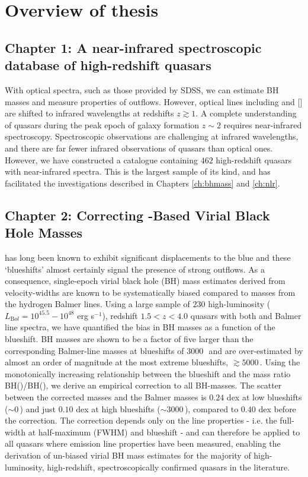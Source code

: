 \section{Overview of thesis}

\subsection{Chapter 1: A near-infrared spectroscopic database of high-redshift quasars}

With optical spectra, such as those provided by SDSS, we can estimate BH masses and measure properties of outflows. 
However, optical lines including \hb and [] are shifted to infrared wavelengths at redshifts $z\gtrsim1$. 
A complete understanding of quasars during the peak epoch of galaxy formation $z\sim2$ requires near-infrared spectroscopy. 
Spectroscopic observations are challenging at infrared wavelengths, and there are far fewer infrared observations of quasars than optical ones. 
However, we have constructed a catalogue containing $462$ high-redshift quasars with near-infrared spectra. 
This is the largest sample of its kind, and has facilitated the investigations described in Chapters \ref{ch:bhmass} and \ref{ch:nlr}.   

\subsection{Chapter 2: Correcting -Based Virial Black Hole Masses}

 has long been known to exhibit significant displacements to the blue and these `blueshifts' almost certainly signal the presence of strong outflows.
As a consequence, single-epoch virial black hole (BH) mass estimates derived from  velocity-widths are known to be systematically biased compared to masses from the hydrogen Balmer lines. 
Using a large sample of $230$ high-luminosity ($L_{\mathrm Bol} = 10^{45.5}-10^{48}$ erg s$^{-1}$), redshift $1.5 < z < 4.0$ quasars with both  and Balmer line spectra, we have quantified the bias in  BH masses as a function of the  blueshift. 
 BH masses are shown to be a factor of five larger than the corresponding Balmer-line masses at  blueshifts of $3000$\,\kms\, and are over-estimated by almost an order of magnitude at the most extreme blueshifts, $\gtrsim 5000$\,\kms.
Using the monotonically increasing relationship between the  blueshift and the mass ratio BH()/BH(\hans), we derive an empirical correction to all  BH-masses.
The scatter between the corrected  masses and the Balmer masses is $0.24$ dex at low  blueshifts ($\sim0$\,\kms) and just $0.10$ dex at high blueshifts ($\sim3000$\,\kms), compared to $0.40$ dex before the correction. 
The correction depends only on the  line properties - i.e. the full-width at half-maximum (FWHM) and blueshift - and can therefore be applied to all quasars where  emission line properties have been measured, enabling the derivation of un-biased virial BH mass estimates for the majority of high-luminosity, high-redshift, spectroscopically confirmed quasars in the literature.

